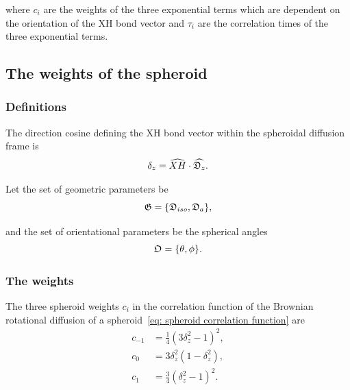 \noindent where $c_i$ are the weights of the three exponential terms which are dependent on the orientation of the XH bond vector and $\tau_i$ are the correlation times of the three exponential terms.




\subsection{The weights of the spheroid}


\subsubsection{Definitions}

The direction cosine defining the XH bond vector within the spheroidal diffusion frame is
\begin{equation}
    \delta_z = \widehat{XH} \cdot \widehat{\mathfrak{D}_z}.
\end{equation}

\noindent Let the set of geometric parameters be
\begin{equation}
    \mathfrak{G} = \{\mathfrak{D}_{iso}, \mathfrak{D}_a\},
\end{equation}

\noindent and the set of orientational parameters be the spherical angles
\begin{equation}
    \mathfrak{O} = \{\theta, \phi\}.
\end{equation}



\subsubsection{The weights}

The three spheroid weights $c_i$ in the correlation function of the Brownian rotational diffusion of a spheroid~\eqref{eq: spheroid correlation function} are
\begin{subequations}
\begin{align}
 c_{-1} &= \tfrac{1}{4} (3\delta_z^2 - 1)^2,   \\
 c_{0}  &= 3\delta_z^2(1 - \delta_z^2),   \\
 c_{1}  &= \tfrac{3}{4} (\delta_z^2 - 1)^2.
\end{align}
\end{subequations}



